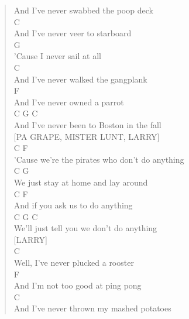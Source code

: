 \documentclass[11pt]{article}
\begin{document}
\begin{verse}
And I've never swabbed the poop deck\\
\hspace*{9em}C\\
And I've never veer to starboard\\
\hspace*{9em}G\\
'Cause I never sail at all\\
\hspace*{9em}C\\
And I've never walked the gangplank\\
\hspace*{9em}F\\
And I've never owned a parrot\\
\hspace*{9em}C             G             C\\
And I've never been to Boston in the fall\\
\vspace*{1em}
\vspace*{1em}
[PA GRAPE, MISTER LUNT, LARRY]\\
\hspace*{17em}C                    F\\
'Cause we're the pirates who don't do anything\\
\hspace*{8em}C                    G\\
We just stay at home and lay around\\
\hspace*{7em}C                F\\
And if you ask us to do anything\\
\hspace*{1em}C         G                    C\\
We'll just tell you we don't do anything\\
\vspace*{1em}
\vspace*{1em}
[LARRY]\\
\hspace*{1em}C\\
Well, I've never plucked a rooster\\
\hspace*{8em}F\\
And I'm not too good at ping pong\\
\hspace*{9em}C\\
And I've never thrown my mashed potatoes\\

\end{verse}
\end{document}

